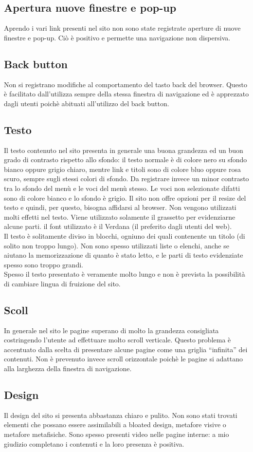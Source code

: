 \documentclass[../ProgettoTecWeb2.tex]{subfiles}
\begin{document}
	\subsection{Apertura nuove finestre e pop-up}
	Aprendo i vari link presenti nel sito non sono state registrate aperture di nuove finestre e pop-up. Ciò è positivo e permette una navigazione non dispersiva.

	\subsection{Back button}
	Non si registrano modifiche al comportamento del tasto back del browser. Questo è facilitato dall'utilizza sempre della stessa finestra di navigazione ed è apprezzato dagli utenti poichè abituati all'utilizzo del back button.

	\subsection{Testo}
	Il testo contenuto nel sito presenta in generale una buona grandezza ed un buon grado di contrasto rispetto allo sfondo: il testo normale è di colore nero su sfondo bianco oppure grigio chiaro, mentre link e titoli sono di colore bluo oppure rosa scuro, sempre sugli stessi colori di sfondo. Da registrare invece un minor contrasto tra lo sfondo del menù e le voci del menù stesso. Le voci non selezionate difatti sono di colore bianco e lo sfondo è grigio. Il sito non offre opzioni per il resize del testo e quindi, per questo, bisogna affidarsi al browser. Non vengono utilizzati molti effetti nel testo. Viene utilizzato solamente il grassetto per evidenziarne alcune parti. il font utilizzato è il Verdana (il preferito dagli utenti del web). \\
	Il testo è solitamente diviso in blocchi, ogniuno dei quali contenente un titolo (di solito non troppo lungo). Non sono spesso utilizzati liste o elenchi, anche se aiutano la memorizzazione di quanto è stato letto, e le parti di testo evidenziate spesso sono troppo grandi. \\
	Spesso il testo presentato è veramente molto lungo e non è prevista la possibilità di cambiare lingua di fruizione del sito.

	\subsection{Scoll}
	In generale nel sito le pagine superano di molto la grandezza consigliata costringendo l'utente ad effettuare molto scroll verticale. Questo problema è accentuato dalla scelta di presentare alcune pagine come una griglia ``infinita'' dei contenuti. Non è prevenuto invece scroll orizzontale poichè le pagine si adattano alla larghezza della finestra di navigazione.

	\subsection{Design}
	Il design del sito si presenta abbastanza chiaro e pulito. Non sono stati trovati elementi che possano essere assimilabili a bloated design, metafore visive o metafore metafisiche. Sono spesso presenti video nelle pagine interne: a mio giudizio completano i contenuti e la loro presenza è positiva.
\end{document}
